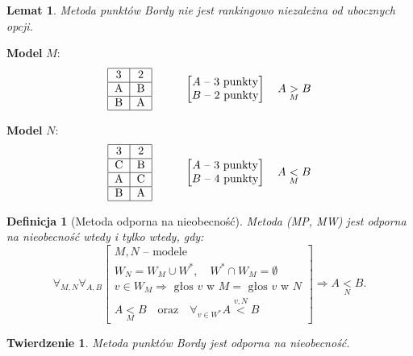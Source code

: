 \documentclass[12pt,a4paper]{article}
\theoremstyle{break}
\newtheorem{definition}{Definicja}[section]
\newtheorem{theorem}{Twierdzenie}[section]
\newtheorem{lemma}{Lemat}[section]
\begin{document}
	\begin{lemma}
		Metoda punktów Bordy nie jest rankingowo niezależna od ubocznych opcji.
	\end{lemma}
	
	\noindent \textbf{Model } $M$:
	\[
	\begin{tabular}{|c|c|}
		\hline
		3 & 2 \\ \hline
		A & B \\ \hline
		B & A \\ \hline
	\end{tabular}
	\hspace{1cm}
	\begin{bmatrix}
		A \text{ -- 3 punkty} \\
		B \text{ -- 2 punkty}
	\end{bmatrix}
	\quad A \underset{M}{>} B
	\]
	
	\noindent \textbf{Model } $N$:
	\[
	\begin{tabular}{|c|c|}
		\hline
		3 & 2 \\ \hline
		C & B \\ \hline
		A & C \\ \hline
		B & A \\ \hline
	\end{tabular}
	\hspace{1cm}
	\begin{bmatrix}
		A \text{ -- 3 punkty} \\
		B \text{ -- 4 punkty}
	\end{bmatrix}
	\quad A \underset{M}{<} B
	\]
	\begin{definition}[Metoda odporna na nieobecność]
		Metoda (MP, MW) jest odporna na nieobecność wtedy i tylko wtedy, gdy:
		\[
		\forall_{M,N} \forall_{A,B} 
		\begin{bmatrix}
			M, N \text{ -- modele} \\
			W_N = W_M \cup W^*, \quad W^* \cap W_M = \emptyset \\
			v \in W_M \Rightarrow \text{ głos } v \text{ w } M = \text{ głos } v \text{ w } N \\
			A \underset{M}{<} B \quad \text{oraz} \quad \forall_{v \in W^*} A \overset{v,N}{<}B
		\end{bmatrix}
		\Rightarrow A \underset{N}{<} B.
		\]
	\end{definition}
	
	\begin{theorem}
		Metoda punktów Bordy jest odporna na nieobecność.
	\end{theorem}
	
\end{document}
